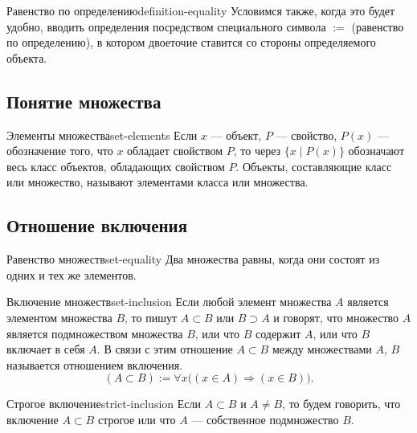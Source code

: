 \begin{definition}{Равенство по определению}{definition-equality}
  Условимся также, когда это будет удобно, вводить определения посредством
  специального символа $:=$ (равенство по определению), в котором двоеточие
  ставится со стороны определяемого объекта.
\end{definition}


\subsection{Понятие множества}

\begin{definition}{Элементы множества}{set-elements}
  Если $x$ — объект, $P$ — свойство, $P(x)$ — обозначение того, что $x$
  обладает свойством $P$, то через $\{x\mid P(x)\}$ обозначают весь класс
  объектов, обладающих свойством $P$. Объекты, составляющие класс или
  множество, называют элементами класса или множества.
\end{definition}

\subsection{Отношение включения}

\begin{definition}{Равенство множеств}{set-equality}
  Два множества равны, когда они состоят из одних и тех же элементов.
\end{definition}

\begin{definition}{Включение множеств}{set-inclusion}
  Если любой элемент множества $A$ является элементом множества $B$, то
  пишут $A\subset B$ или $B\supset A$ и говорят, что множество $A$ является
  подмножеством множества $B$, или что $B$ содержит $A$, или что $B$ включает
  в себя $A$. В связи с этим отношение $A\subset B$ между множествами $A$,
  $B$ называется отношением включения.
  \[
    (A\subset B):=\forall x\bigl((x\in A)\Rightarrow(x\in B)\bigr).
  \]
\end{definition}

\begin{definition}{Строгое включение}{strict-inclusion}
  Если $A\subset B$ и $A\ne B$, то будем говорить, что включение
  $A\subset B$ строгое или что $A$ — собственное подмножество $B$.
\end{definition}

